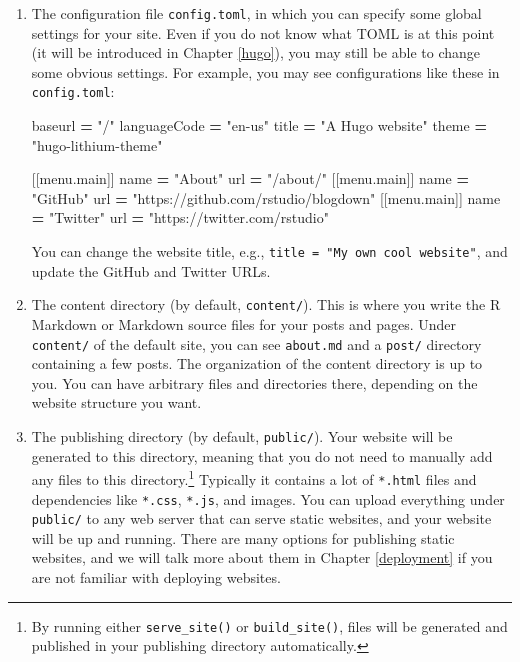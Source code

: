 \documentclass[12pt,]{krantz}
\makeatletter
\newenvironment{Shaded}{\begin{snugshade}}{\end{snugshade}}
\newcommand{\AttributeTok}[1]{\textcolor[rgb]{0.77,0.63,0.00}{#1}}
\newcommand{\NormalTok}[1]{#1}
\newcommand{\OperatorTok}[1]{\textcolor[rgb]{0.81,0.36,0.00}{\textbf{#1}}}
\newcommand{\StringTok}[1]{\textcolor[rgb]{0.31,0.60,0.02}{#1}}
\newcommand{\VariableTok}[1]{\textcolor[rgb]{0.00,0.00,0.00}{#1}}
\newenvironment{kframe}{%
\medskip{}
\setlength{\fboxsep}{.8em}
 \def\at@end@of@kframe{}%
 \ifinner\ifhmode%
  \def\at@end@of@kframe{\end{minipage}}%
  \begin{minipage}{\columnwidth}%
 \fi\fi%
 \def\FrameCommand##1{\hskip\@totalleftmargin \hskip-\fboxsep
 \colorbox{shadecolor}{##1}\hskip-\fboxsep
     \hskip-\linewidth \hskip-\@totalleftmargin \hskip\columnwidth}%
 \MakeFramed {\advance\hsize-\width
   \@totalleftmargin\z@ \linewidth\hsize
   \@setminipage}}%
 {\par\unskip\endMakeFramed%
 \at@end@of@kframe}
\renewenvironment{Shaded}{\begin{kframe}}{\end{kframe}}
\theoremstyle{definition}
\theoremstyle{definition}
\theoremstyle{definition}
\theoremstyle{remark}
\makeatother
\begin{document}
\begin{enumerate}
\def\labelenumi{\arabic{enumi}.}
\item
  The configuration file \texttt{config.toml}, in
  which you can specify some global settings for your site. Even if you
  do not know what TOML is at this point (it will be introduced in
  Chapter \ref{hugo}), you may still be able to change some obvious
  settings. For example, you may see configurations like these in
  \texttt{config.toml}:

\begin{Shaded}
\begin{Highlighting}[]
\NormalTok{baseurl }\OperatorTok{=} \StringTok{"/"}
\NormalTok{languageCode }\OperatorTok{=} \StringTok{"en-us"}
\NormalTok{title }\OperatorTok{=} \StringTok{"A Hugo website"}
\NormalTok{theme }\OperatorTok{=} \StringTok{"hugo-lithium-theme"}

\NormalTok{[[}\VariableTok{menu}\NormalTok{.}\AttributeTok{main}\NormalTok{]]}
\NormalTok{    name }\OperatorTok{=} \StringTok{"About"}
\NormalTok{    url }\OperatorTok{=} \StringTok{"/about/"}
\NormalTok{[[}\VariableTok{menu}\NormalTok{.}\AttributeTok{main}\NormalTok{]]}
\NormalTok{    name }\OperatorTok{=} \StringTok{"GitHub"}
\NormalTok{    url }\OperatorTok{=} \StringTok{"https://github.com/rstudio/blogdown"}
\NormalTok{[[}\VariableTok{menu}\NormalTok{.}\AttributeTok{main}\NormalTok{]]}
\NormalTok{    name }\OperatorTok{=} \StringTok{"Twitter"}
\NormalTok{    url }\OperatorTok{=} \StringTok{"https://twitter.com/rstudio"}
\end{Highlighting}
\end{Shaded}

  You can change the website title, e.g.,
  \texttt{title\ =\ "My\ own\ cool\ website"}, and update the GitHub and
  Twitter URLs.
\item
  The content directory (by default, \texttt{content/}). This is where
  you write the R Markdown or Markdown source files for your posts and
  pages. Under \texttt{content/} of the default site, you can see
  \texttt{about.md} and a \texttt{post/} directory containing a few
  posts. The organization of the content directory is up to you. You can
  have arbitrary files and directories there, depending on the website
  structure you want.
\item
  The publishing directory (by default, \texttt{public/}). Your website
  will be generated to this directory, meaning that you do not need to
  manually add any files to this directory.\footnote{By running either
    \texttt{serve\_site()} or \texttt{build\_site()}, files will be
    generated and published in your publishing directory automatically.}
  Typically it contains a lot of \texttt{*.html} files and dependencies
  like \texttt{*.css}, \texttt{*.js}, and images. You can upload
  everything under \texttt{public/} to any web server that can serve
  static websites, and your website will be up and running. There are
  many options for publishing static websites, and we will talk more
  about them in Chapter \ref{deployment} if you are not familiar with
  deploying websites.
\end{enumerate}
\end{document}
